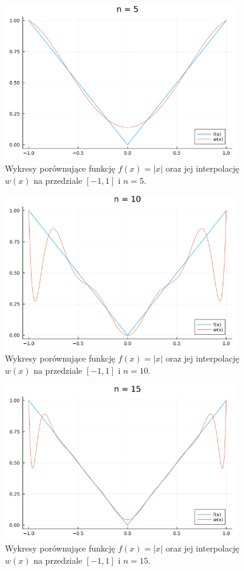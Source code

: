 \documentclass{article}
\begin{document}
\begin{figure}[H]
    \centering
    \includegraphics[width=0.9\textwidth]{../plots/ex5_1_n5.png}
    \caption{Wykresy porównujące funkcję $f(x) = |x|$ oraz jej interpolację $w(x)$ na przedziale $[-1, 1]$ i $n=5$.}
\end{figure}
\begin{figure}[H]
    \centering
    \includegraphics[width=0.9\textwidth]{../plots/ex5_1_n10.png}
    \caption{Wykresy porównujące funkcję $f(x) = |x|$ oraz jej interpolację $w(x)$ na przedziale $[-1, 1]$ i $n=10$.}
\end{figure}
\begin{figure}[H]
    \centering
    \includegraphics[width=0.9\textwidth]{../plots/ex5_1_n15.png}
    \caption{Wykresy porównujące funkcję $f(x) = |x|$ oraz jej interpolację $w(x)$ na przedziale $[-1, 1]$ i $n=15$.}
\end{figure}
\end{document}
